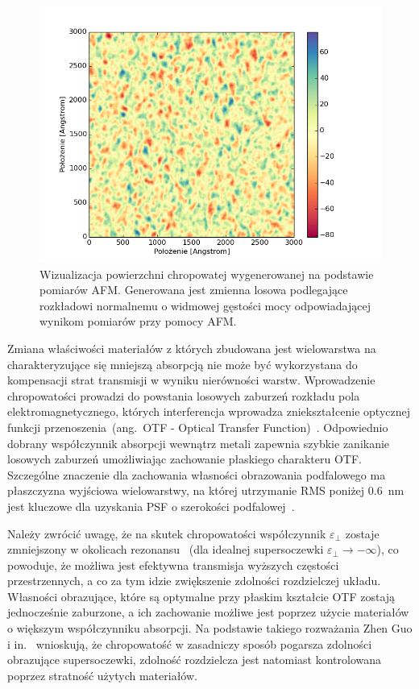 \begin{figure}[bt]
		\includegraphics[width=\textwidth]{images/multilayer/ag30nm-afm-generated.png}
		\caption{Wizualizacja powierzchni chropowatej wygenerowanej na podstawie pomiarów AFM. Generowana jest zmienna losowa podlegające rozkładowi normalnemu o widmowej gęstości mocy odpowiadającej wynikom pomiarów przy pomocy AFM.} 
		\label{fig:ag30nm-afmgene}
\end{figure}


Zmiana właściwości materiałów z których zbudowana jest wielowarstwa na charakteryzujące się mniejszą absorpcją nie może być wykorzystana do kompensacji strat transmisji w wyniku nierówności warstw. Wprowadzenie chropowatości prowadzi do powstania losowych zaburzeń rozkładu pola elektromagnetycznego, których interferencja wprowadza zniekształcenie optycznej funkcji przenoszenia~(ang.~OTF - Optical Transfer Function)~\cite{citeulike:2926459}. Odpowiednio dobrany współczynnik absorpcji wewnątrz metali zapewnia szybkie zanikanie losowych zaburzeń umożliwiając zachowanie płaskiego charakteru OTF. Szczególne znaczenie dla zachowania własności obrazowania podfalowego ma płaszczyzna wyjściowa wielowarstwy, na której utrzymanie RMS poniżej $0.6$~nm jest kluczowe dla uzyskania PSF o szerokości podfalowej~\cite{guo2014negative}.

Należy zwrócić uwagę, że na skutek chropowatości współczynnik $\varepsilon_{\perp}$ zostaje zmniejszony w okolicach rezonansu~\cite{guo2014negative} (dla idealnej supersoczewki $\varepsilon_{\perp} \to - \infty$), co powoduje, że możliwa jest efektywna transmisja wyższych częstości przestrzennych, a co za tym idzie zwiększenie zdolności rozdzielczej układu. Własności obrazujące, które są optymalne przy płaskim kształcie OTF zostają jednocześnie zaburzone, a ich zachowanie możliwe jest poprzez użycie materiałów o większym współczynniku absorpcji. Na podstawie takiego rozważania Zhen Guo i in.~\cite{guo2014negative} wnioskują, że chropowatość w zasadniczy sposób pogarsza zdolności obrazujące supersoczewki, zdolność rozdzielcza jest natomiast kontrolowana poprzez stratność użytych materiałów.

